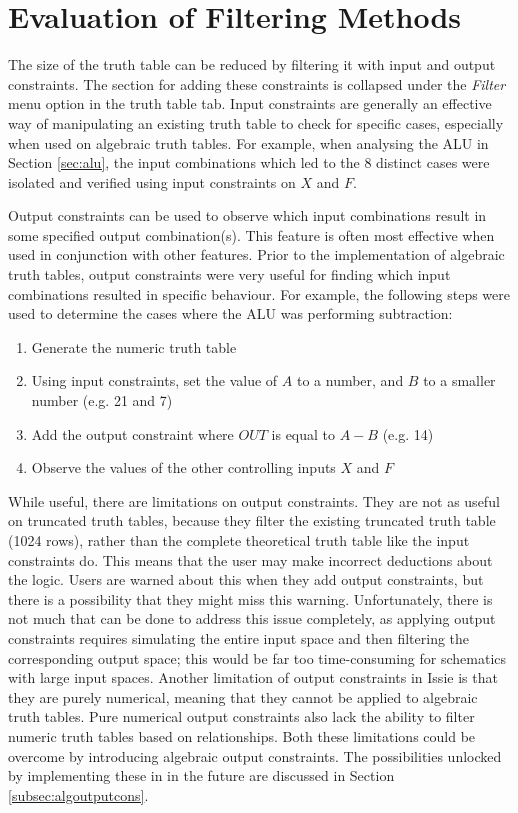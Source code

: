\section{Evaluation of Filtering Methods}
The size of the truth table can be reduced by filtering it with input and output constraints. The section for adding these constraints is collapsed under the \textit{Filter} menu option in the truth table tab. Input constraints are generally an effective way of manipulating an existing truth table to check for specific cases, especially when used on algebraic truth tables. For example, when analysing the ALU in Section \ref{sec:alu}, the input combinations which led to the 8 distinct cases were isolated and verified using input constraints on $X$ and $F$.

Output constraints can be used to observe which input combinations result in some specified output combination(s). This feature is often most effective when used in conjunction with other features. Prior to the implementation of algebraic truth tables, output constraints were very useful for finding which input combinations resulted in specific behaviour. For example, the following steps were used to determine the cases where the ALU was performing subtraction:
\begin{enumerate}
    \item Generate the numeric truth table
    \item Using input constraints, set the value of $A$ to a number, and $B$ to a smaller number (e.g. 21 and 7)
    \item Add the output constraint where $OUT$ is equal to $A -B$ (e.g. 14)
    \item Observe the values of the other controlling inputs $X$ and $F$
\end{enumerate}
While useful, there are limitations on output constraints. They are not as useful on truncated truth tables, because they filter the existing truncated truth table (1024 rows), rather than the complete theoretical truth table like the input constraints do. This means that the user may make incorrect deductions about the logic. Users are warned about this when they add output constraints, but there is a possibility that they might miss this warning. Unfortunately, there is not much that can be done to address this issue completely, as applying output constraints requires simulating the entire input space and then filtering the corresponding output space; this would be far too time-consuming for schematics with large input spaces. 
Another limitation of output constraints in Issie is that they are purely numerical, meaning that they cannot be applied to algebraic truth tables. Pure numerical output constraints also lack the ability to filter numeric truth tables based on relationships. Both these limitations could be overcome by introducing algebraic output constraints. The possibilities unlocked by implementing these in in the future are discussed in Section \ref{subsec:algoutputcons}.

